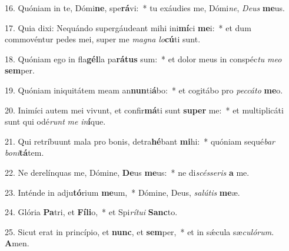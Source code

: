 16. Quóniam in te, Dómi\textbf{ne}, spe\textbf{rá}vi:~*  tu exáudies me, Dómi\textit{ne}, \textit{De}\textit{us} \textbf{me}us.\

17. Quia dixi: Nequándo supergáudeant mihi ini\textbf{mí}ci \textbf{me}i:~*  et dum commovéntur pedes mei, super me \textit{ma}\textit{gna} \textit{lo}\textbf{cú}ti sunt.\

18. Quóniam ego in fla\textbf{gél}la pa\textbf{rá}\textbf{tus} sum:~*  et dolor meus in conspéc\textit{tu} \textit{me}\textit{o} \textbf{sem}per.\

19. Quóniam iniquitátem meam an\textbf{nun}ti\textbf{á}bo:~*  et cogitábo pro \textit{pec}\textit{cá}\textit{to} \textbf{me}o.\

20. Inimíci autem mei vivunt, et confir\textbf{má}ti sunt \textbf{su}\textbf{per} me:~*  et multiplicáti sunt qui odé\textit{runt} \textit{me} \textit{in}\textbf{í}que.\

21. Qui retríbuunt mala pro bonis, detra\textbf{hé}bant \textbf{mi}hi:~*  quóniam sequé\textit{bar} \textit{bo}\textit{ni}\textbf{tá}tem.\

22. Ne derelínquas me, Dómine, \textbf{De}us \textbf{me}us:~*  ne di\textit{scés}\textit{se}\textit{ris} \textbf{a} me.\

23. Inténde in adju\textbf{tó}rium \textbf{me}um,~*  Dómine, Deus, \textit{sa}\textit{lú}\textit{tis} \textbf{me}æ.\

24. Glória \textbf{Pa}tri, et \textbf{Fí}\textbf{li}o,~*  et Spi\textit{rí}\textit{tu}\textit{i} \textbf{Sanc}to.\

25. Sicut erat in princípio, et \textbf{nunc}, et \textbf{sem}per,~*  et in sǽcula sæ\textit{cu}\textit{ló}\textit{rum}. \textbf{A}men.\

